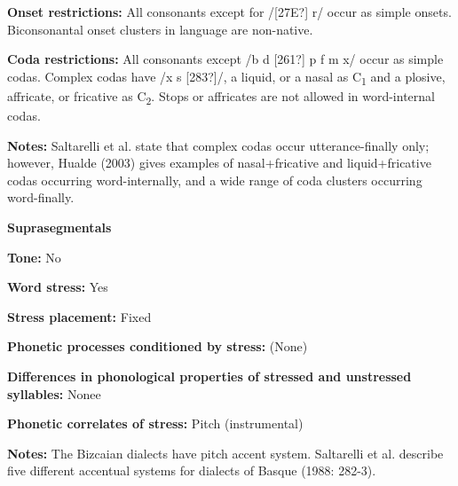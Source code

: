 \begin{styleBody}
\textbf{Onset restrictions:} All consonants except for /[27E?] r/ occur as simple onsets. Biconsonantal onset clusters in language are non-native.
\end{styleBody}

\begin{styleBody}
\textbf{Coda restrictions: }All consonants except /b d [261?] p f m x/ occur as simple codas. Complex codas have /x s [283?]/, a liquid, or a nasal as C\textsubscript{1} and a plosive, affricate, or fricative as C\textsubscript{2}. Stops or affricates are not allowed in word-internal codas.
\end{styleBody}

\begin{styleBody}
\textbf{Notes: }Saltarelli et al. state that complex codas occur utterance-finally only; however, Hualde (2003) gives examples of nasal+fricative and liquid+fricative codas occurring word-internally, and a wide range of coda clusters occurring word-finally.
\end{styleBody}

\begin{styleBody}
\textbf{Suprasegmentals}
\end{styleBody}

\begin{styleBody}
\textbf{Tone:} No
\end{styleBody}

\begin{styleBody}
\textbf{Word stress:} Yes
\end{styleBody}

\begin{styleBody}
\textbf{Stress placement:} Fixed
\end{styleBody}

\begin{styleBody}
\textbf{Phonetic processes conditioned by stress:} (None)
\end{styleBody}

\begin{styleBody}
\textbf{Differences in phonological properties of stressed and unstressed syllables:} Nonee
\end{styleBody}

\begin{styleBody}
\textbf{Phonetic correlates of stress: }Pitch (instrumental)
\end{styleBody}

\begin{styleBody}
\textbf{Notes: }The Bizcaian dialects have pitch accent system. Saltarelli et al. describe five different accentual systems for dialects of Basque (1988: 282-3).
\end{styleBody}


